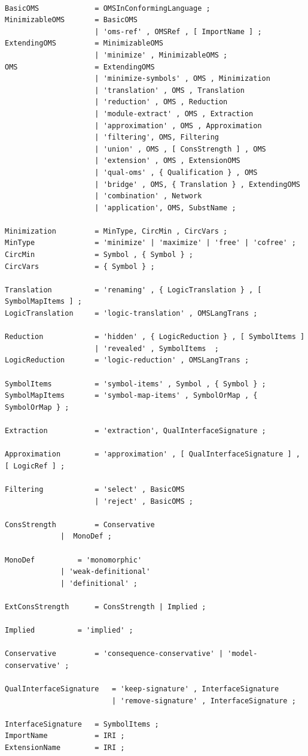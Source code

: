 \documentclass[10pt,fleqn,%
\ifpretendfinal
final%
\else
draft%
\fi,
]{scrreprt}
\begin{document}
\begin{lstlisting}[language=ebnf,escapeinside={<>}]  % abstract syntax

BasicOMS             = OMSInConformingLanguage ;
MinimizableOMS       = BasicOMS
                     | 'oms-ref' , OMSRef , [ ImportName ] ;
ExtendingOMS         = MinimizableOMS
                     | 'minimize' , MinimizableOMS ;
OMS                  = ExtendingOMS
                     | 'minimize-symbols' , OMS , Minimization
                     | 'translation' , OMS , Translation
                     | 'reduction' , OMS , Reduction
                     | 'module-extract' , OMS , Extraction 
                     | 'approximation' , OMS , Approximation
                     | 'filtering', OMS, Filtering
                     | 'union' , OMS , [ ConsStrength ] , OMS 
                     | 'extension' , OMS , ExtensionOMS
                     | 'qual-oms' , { Qualification } , OMS
                     | 'bridge' , OMS, { Translation } , ExtendingOMS
                     | 'combination' , Network
                     | 'application', OMS, SubstName ;

Minimization         = MinType, CircMin , CircVars ;
MinType              = 'minimize' | 'maximize' | 'free' | 'cofree' ;
CircMin              = Symbol , { Symbol } ;
CircVars             = { Symbol } ;

Translation          = 'renaming' , { LogicTranslation } , [ SymbolMapItems ] ;
LogicTranslation     = 'logic-translation' , OMSLangTrans ;

Reduction            = 'hidden' , { LogicReduction } , [ SymbolItems ]
                     | 'revealed' , SymbolItems  ;
LogicReduction       = 'logic-reduction' , OMSLangTrans ;

SymbolItems          = 'symbol-items' , Symbol , { Symbol } ;
SymbolMapItems       = 'symbol-map-items' , SymbolOrMap , { SymbolOrMap } ;

Extraction           = 'extraction', QualInterfaceSignature ;

Approximation        = 'approximation' , [ QualInterfaceSignature ] , [ LogicRef ] ;

Filtering            = 'select' , BasicOMS 
                     | 'reject' , BasicOMS ;

ConsStrength         = Conservative 
		     |  MonoDef ;

MonoDef 	     = 'monomorphic'  
		     | 'weak-definitional' 
		     | 'definitional' ;

ExtConsStrength      = ConsStrength | Implied ;

Implied 	     = 'implied' ;

Conservative         = 'consequence-conservative' | 'model-conservative' ;

QualInterfaceSignature   = 'keep-signature' , InterfaceSignature 
                         | 'remove-signature' , InterfaceSignature ;

InterfaceSignature   = SymbolItems ;
ImportName           = IRI ;
ExtensionName        = IRI ;
\end{lstlisting}
\end{document}

